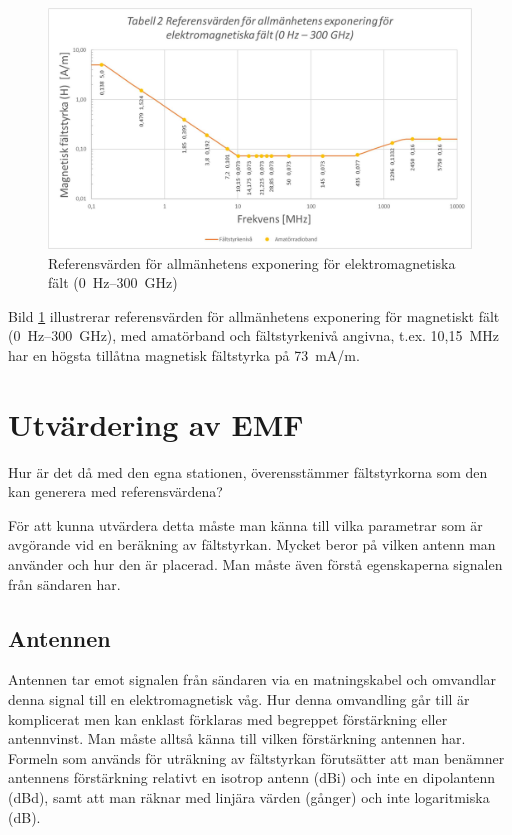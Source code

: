 \begin{figure}[h]
\begin{center}
\includegraphics[width=14cm]{images/emfbild-001}
\caption{Referensvärden för allmänhetens exponering för elektromagnetiska fält (0~Hz--300~GHz)}
\label{fig:emf2}
\end{center}
\end{figure}

Bild \ref{fig:emf2} illustrerar referensvärden för allmänhetens
exponering för magnetiskt fält (0~Hz--300~GHz), med amatörband
och fältstyrkenivå angivna, t.ex. 10,15~MHz har en högsta tillåtna
magnetisk fältstyrka på 73~mA/m.

\section{Utvärdering av EMF}

Hur är det då med den egna stationen, överensstämmer fältstyrkorna som
den kan generera med referensvärdena?

För att kunna utvärdera detta måste man känna till vilka parametrar
som är avgörande vid en beräkning av fältstyrkan. Mycket beror på
vilken antenn man använder och hur den är placerad.
Man måste även förstå egenskaperna signalen från sändaren har.

\subsection{Antennen}

Antennen tar emot signalen från sändaren via en matningskabel och
omvandlar denna signal till en elektromagnetisk våg. Hur denna
omvandling går till är komplicerat men kan enklast förklaras med
begreppet förstärkning eller antennvinst. Man måste alltså känna
till vilken förstärkning antennen har. Formeln som används för
uträkning av fältstyrkan förutsätter att man benämner antennens
förstärkning relativt en isotrop antenn (dBi) och inte en
dipolantenn (dBd), samt att man räknar med linjära värden (gånger)
och inte logaritmiska (dB).

